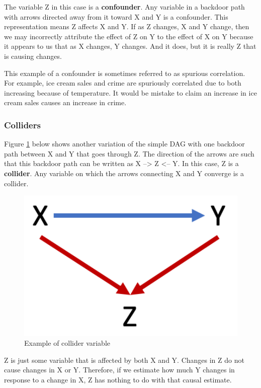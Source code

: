 \documentclass[
]{book}
\begin{document}
The variable Z in this case is a \textbf{confounder}. Any variable in a backdoor path with arrows directed away from it toward X and Y is a confounder. This representation means Z affects X and Y. If as Z changes, X and Y change, then we may incorrectly attribute the effect of Z on Y to the effect of X on Y because it appears to us that as X changes, Y changes. And it does, but it is really Z that is causing changes.

This example of a confounder is sometimes referred to as spurious correlation. For example, ice cream sales and crime are spuriously correlated due to both increasing because of temperature. It would be mistake to claim an increase in ice cream sales causes an increase in crime.

\hypertarget{colliders}{%
\subsubsection*{Colliders}\label{colliders}}

Figure \ref{fig:dagcoll} below shows another variation of the simple DAG with one backdoor path between X and Y that goes through Z. The direction of the arrows are such that this backdoor path can be written as X --\textgreater{} Z \textless-- Y. In this case, Z is a \textbf{collider}. Any variable on which the arrows connecting X and Y converge is a collider.

\begin{figure}
\includegraphics[width=5.42in]{images/dag_collide} \caption{Example of collider variable}\label{fig:dagcoll}
\end{figure}

Z is just some variable that is affected by both X and Y. Changes in Z do not cause changes in X or Y. Therefore, if we estimate how much Y changes in response to a change in X, Z has nothing to do with that causal estimate.
\end{document}
